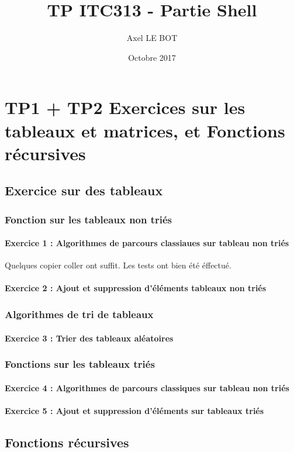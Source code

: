 \documentclass{article}
\title{TP ITC313 - Partie Shell}
\author{Axel LE BOT}
\date{Octobre 2017}
\begin{document}
\maketitle
\tableofcontents

\section{TP1 + TP2 Exercices sur les tableaux et matrices, et Fonctions récursives}
    \subsection{Exercice sur des tableaux}
        \subsubsection{Fonction sur les tableaux non triés}
            \paragraph{Exercice 1 : Algorithmes de parcours classiaues sur tableau non triés}
                Quelques copier coller ont suffit.
                Les tests ont bien été éffectué.
            \paragraph{Exercice 2 : Ajout et suppression d'éléments tableaux non triés}
        \subsubsection{Algorithmes de tri de tableaux}
            \paragraph{Exercice 3 : Trier des tableaux aléatoires}
        \subsubsection{Fonctions sur les tableaux triés}
            \paragraph{Exercice 4 : Algorithmes de parcours classiques sur tableau non triés}
            \paragraph{Exercice 5 : Ajout et suppression d’éléments sur tableaux triés}
    \subsection{Fonctions récursives}
\end{document}
